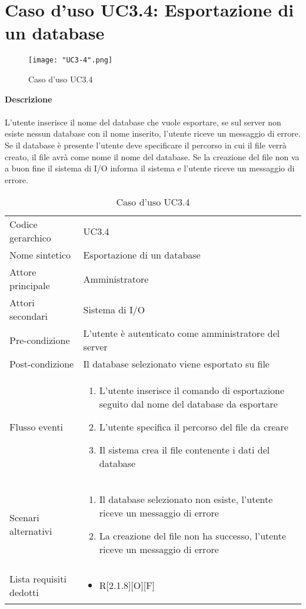 \documentclass[a4paper]{report}
\begin{document}
	 \section{Caso d'uso UC3.4: Esportazione di un database}
	 	\begin{figure}[H]
			\centering
			\texttt{[image: "UC3-4".png]}
			\caption{Caso d'uso UC3.4}
		\end{figure}
	 \textbf{Descrizione} \\ \\
	 L'utente inserisce il nome del database che vuole esportare, se sul server non esiste nessun database 
	 con il nome inserito, l'utente riceve un messaggio di errore. \\
	 Se il database è presente l'utente deve specificare il percorso in cui il file verrà creato, il file avrà come
	 nome il nome del database. Se la creazione del file non va a buon fine il sistema di I/O informa il 
	 sistema e l'utente riceve un messaggio di errore.
		\begin{table}[H]
		\begin{tabularx}{\textwidth}{X | X}\toprule
			\rowcolor{orange!65}Codice gerarchico & UC3.4 \\
			Nome sintetico & Esportazione di un database \\
			\rowcolor{orange!65}Attore principale & Amministratore\\
			Attori secondari & Sistema di I/O \\
			\rowcolor{orange!65}Pre-condizione & L'utente è autenticato come amministratore del server\\
			Post-condizione & Il database selezionato viene esportato su file \\
			\rowcolor{orange!65}Flusso eventi & \begin{enumerate}
			\item L'utente inserisce il comando di esportazione seguito dal nome del database da esportare
			\item L'utente specifica il percorso del file da creare
			\item Il sistema crea il file contenente i dati del database
			\end{enumerate} \\
			Scenari alternativi & \begin{enumerate}
			\item Il database selezionato non esiste, l'utente riceve un messaggio di errore
			\item La creazione del file non ha successo, l'utente riceve un messaggio di errore
			\end{enumerate} \\
			\rowcolor{orange!65}Lista requisiti dedotti & \begin{itemize}
			\item R[2.1.8][O][F]
			\end{itemize} \\
			\bottomrule
		\end{tabularx}
		\caption{Caso d'uso UC3.4}
	 \end{table}
\end{document}
